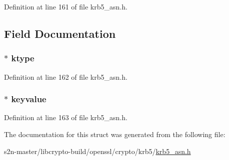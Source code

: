 Definition at line 161 of file krb5\+\_\+asn.\+h.



\subsection{Field Documentation}
\subsubsection[{\texorpdfstring{ktype}{ktype}}]{ $\ast$ ktype}\hypertarget{structkrb5__encryptionkey__st_a837ea9d63a312c9c9f8d14ad750b3cb1}{}\label{structkrb5__encryptionkey__st_a837ea9d63a312c9c9f8d14ad750b3cb1}


Definition at line 162 of file krb5\+\_\+asn.\+h.

\subsubsection[{\texorpdfstring{keyvalue}{keyvalue}}]{ $\ast$ keyvalue}\hypertarget{structkrb5__encryptionkey__st_a5b8dbefdad76a2b732c63e130c5c2be8}{}\label{structkrb5__encryptionkey__st_a5b8dbefdad76a2b732c63e130c5c2be8}


Definition at line 163 of file krb5\+\_\+asn.\+h.



The documentation for this struct was generated from the following file\+:\begin{DoxyCompactItemize}
\item 
s2n-\/master/libcrypto-\/build/openssl/crypto/krb5/\hyperlink{crypto_2krb5_2krb5__asn_8h}{krb5\+\_\+asn.\+h}\end{DoxyCompactItemize}
